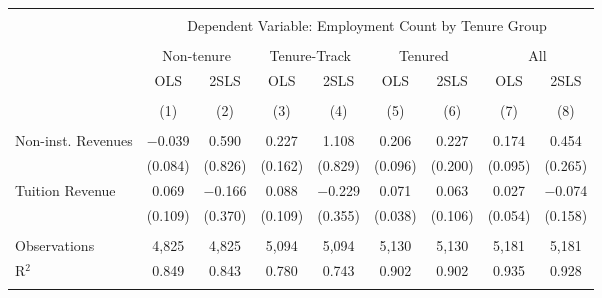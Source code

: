 
\begin{tabular}{@{\extracolsep{5pt}}lcccccccc} 
\\[-1.8ex]\hline 
\hline \\[-1.8ex] 
 & \multicolumn{8}{c}{Dependent Variable: Employment Count by Tenure Group} \\ 
\cline{2-9} 
\\[-1.8ex] & \multicolumn{2}{c}{Non-tenure} & \multicolumn{2}{c}{Tenure-Track} & \multicolumn{2}{c}{Tenured} & \multicolumn{2}{c}{All} \\ 
 & OLS & 2SLS & OLS & 2SLS & OLS & 2SLS & OLS & 2SLS \\ 
\\[-1.8ex] & (1) & (2) & (3) & (4) & (5) & (6) & (7) & (8)\\ 
\hline \\[-1.8ex] 
 Non-inst. Revenues & $-$0.039 & 0.590 & 0.227 & 1.108 & 0.206 & 0.227 & 0.174 & 0.454 \\ 
  & (0.084) & (0.826) & (0.162) & (0.829) & (0.096) & (0.200) & (0.095) & (0.265) \\ 
  Tuition Revenue & 0.069 & $-$0.166 & 0.088 & $-$0.229 & 0.071 & 0.063 & 0.027 & $-$0.074 \\ 
  & (0.109) & (0.370) & (0.109) & (0.355) & (0.038) & (0.106) & (0.054) & (0.158) \\ 
 \hline \\[-1.8ex] 
Observations & 4,825 & 4,825 & 5,094 & 5,094 & 5,130 & 5,130 & 5,181 & 5,181 \\ 
R$^{2}$ & 0.849 & 0.843 & 0.780 & 0.743 & 0.902 & 0.902 & 0.935 & 0.928 \\ 
\hline 
\hline \\[-1.8ex] 
\end{tabular} 
